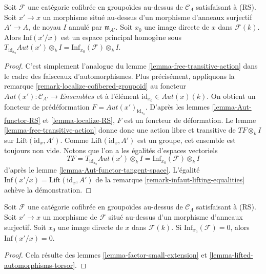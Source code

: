 \begin{lemma}
\label{lemma-lifted-automorphisms-torsor}
Soit $\mathcal{F}$ une catégorie cofibrée en groupoïdes au-dessus de
$\mathcal{C}_\Lambda$ satisfaisant à (RS). Soit $x' \to x$ un morphisme
situé au-dessus d'un morphisme d'anneaux surjectif $A' \to A$, de noyau $I$
annulé par $\mathfrak m_{A'}$. Soit $x_0$ une image directe de $x$ dans
$\mathcal{F}(k)$. Alors $\text{Inf}(x'/x)$ est un espace principal homogène
sous $T_{\text{id}_{x_0}} \mathit{Aut}(x') \otimes_k I
= \text{Inf}_{x_0}(\mathcal{F}) \otimes_k I$.
\end{lemma}

\begin{proof}
C'est simplement l'analogue du lemme \ref{lemma-free-transitive-action} dans
le cadre des faisceaux d'automorphismes. Plus précisément, appliquons la
remarque \ref{remark-localize-cofibered-groupoid} au foncteur
$\mathit{Aut}(x') : \mathcal{C}_{A'} \to \textit{Ensembles}$ et à l'élément
$\text{id}_{x_0} \in \mathit{Aut}(x)(k)$. On obtient un foncteur de
prédéformation $F = \mathit{Aut}(x')_{\text{id}_{x_0}}$. D'après les lemmes
\ref{lemma-Aut-functor-RS} et \ref{lemma-localize-RS}, $F$ est un foncteur de
déformation. Le lemme \ref{lemma-free-transitive-action} donne donc une action
libre et transitive de $TF \otimes_k I$ sur
$\text{Lift}(\text{id}_x, A')$. Comme
$\text{Lift}(\text{id}_x, A')$ est un groupe, cet ensemble est toujours non
vide. Notons que l'on a les égalités d'espaces vectoriels
$$
TF = T_{\text{id}_{x_0}} \mathit{Aut}(x') \otimes_k I =
\text{Inf}_{x_0}(\mathcal{F}) \otimes_k I
$$
d'après le lemme \ref{lemma-Aut-functor-tangent-space}. L'égalité
$\text{Inf}(x'/x) = \text{Lift}(\text{id}_x, A')$ de la remarque
\ref{remark-infaut-lifting-equalities} achève la démonstration.
\end{proof}

\begin{lemma}
\label{lemma-infaut-trivial}
Soit $\mathcal{F}$ une catégorie cofibrée en groupoïdes au-dessus de
$\mathcal{C}_\Lambda$ satisfaisant à (RS). Soit $x' \to x$ un morphisme de
$\mathcal{F}$ situé au-dessus d'un morphisme d'anneaux surjectif. Soit $x_0$ une
image directe de $x$ dans $\mathcal{F}(k)$. Si
$\text{Inf}_{x_0}(\mathcal{F}) = 0$, alors $\text{Inf}(x'/x) = 0$.
\end{lemma}

\begin{proof}
Cela résulte des lemmes \ref{lemma-factor-small-extension} et
\ref{lemma-lifted-automorphisms-torsor}.
\end{proof}

